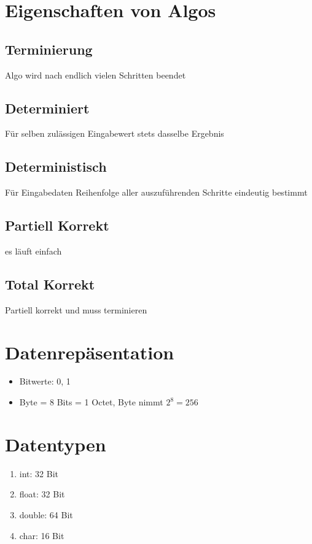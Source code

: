 \documentclass[10pt,a4paper]{article}
\begin{document}
\section{Eigenschaften von Algos}

\subsection{Terminierung}
Algo wird nach endlich vielen Schritten beendet

\subsection{Determiniert}
Für selben zulässigen Eingabewert stets dasselbe Ergebnis

\subsection{Deterministisch}
Für Eingabedaten Reihenfolge aller auszuführenden Schritte eindeutig bestimmt

\subsection{Partiell Korrekt}
es läuft einfach

\subsection{Total Korrekt}
Partiell korrekt und muss terminieren

\section{Datenrepäsentation}
\begin{itemize}
\item Bitwerte: 0, 1
\item Byte = 8 Bits = 1 Octet, Byte nimmt $2^8=256$
\end{itemize}

\section{Datentypen}
\begin{enumerate}
\item int: 32 Bit
\item float: 32 Bit
\item double: 64 Bit
\item char: 16 Bit
\end{enumerate}
\end{document}
